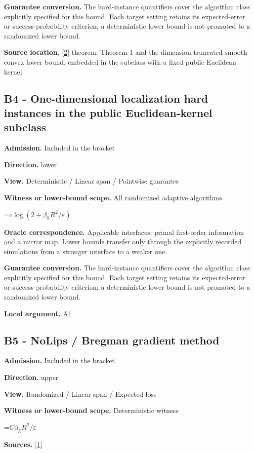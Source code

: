 \documentclass[10pt,a4paper]{article}
\newcommand{\AtlasMath}[1]{\par\begingroup\centering\setbox0=\hbox{$\displaystyle #1$}\ifdim\wd0>1.4\linewidth\typeout{ATLAS WIDE FORMULA: \the\wd0}\fi\ifdim\wd0>\linewidth\resizebox{\linewidth}{!}{\box0}\else\box0\fi\par\endgroup}
\begin{document}
\textbf{Guarantee conversion.} The hard-instance quantifiers cover the algorithm class explicitly specified for this bound. Each target setting retains its expected-error or success-probability criterion; a deterministic lower bound is not promoted to a randomized lower bound.

\textbf{Source location.} \href{https://arxiv.org/pdf/2609.10874}{[2]} theorem: Theorem 1 and the dimension-truncated smooth-convex lower bound, embedded in the subclass with a fixed public Euclidean kernel

\subsection{B4 - One-dimensional localization hard instances in the public Euclidean-kernel subclass}
\textbf{Admission.} Included in the bracket

\textbf{Direction.} lower

\textbf{View.} Deterministic / Linear span / Pointwise guarantee

\textbf{Witness or lower-bound scope.} All randomized adaptive algorithms

\AtlasMath{c\log(2+\beta_hR^2/\varepsilon)}
\textbf{Oracle correspondence.} Applicable interfaces: primal first-order information and a mirror map. Lower bounds transfer only through the explicitly recorded simulations from a stronger interface to a weaker one.

\textbf{Guarantee conversion.} The hard-instance quantifiers cover the algorithm class explicitly specified for this bound. Each target setting retains its expected-error or success-probability criterion; a deterministic lower bound is not promoted to a randomized lower bound.

\textbf{Local argument.} A1

\subsection{B5 - NoLips / Bregman gradient method}
\textbf{Admission.} Included in the bracket

\textbf{Direction.} upper

\textbf{View.} Randomized / Linear span / Expected loss

\textbf{Witness or lower-bound scope.} Deterministic witness

\AtlasMath{C\beta_hR^2/\varepsilon}
\textbf{Sources.} \href{https://arxiv.org/pdf/1911.08510v3}{[1]}
\end{document}
